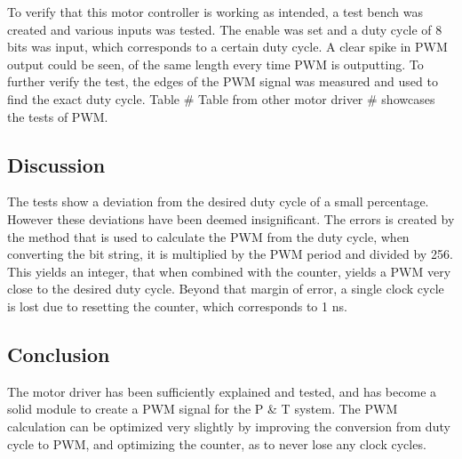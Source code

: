 To verify that this motor controller is working as intended, a test bench was created and various inputs was tested. The enable was set and a duty cycle of 8 bits was input, which corresponds to a certain duty cycle. A clear spike in PWM output could be seen, of the same length every time PWM is outputting.
To further verify the test, the edges of the PWM signal was measured and used to find the exact duty cycle. Table \# Table from other motor driver \# showcases the tests of PWM.

\subsection{Discussion}

The tests show a deviation from the desired duty cycle of a small percentage. However these deviations have been deemed insignificant. The errors is created by the method that is used to calculate the PWM from the duty cycle, when converting the bit string, it is multiplied by the PWM period and divided by 256. This yields an integer, that when combined with the counter, yields a PWM very close to the desired duty cycle. Beyond that margin of error, a single clock cycle is lost due to resetting the counter, which corresponds to 1 ns.


\subsection{Conclusion}

The motor driver has been sufficiently explained and tested, and has become a solid module to create a PWM signal for the P \& T system. The PWM calculation can be optimized very slightly by improving the conversion from duty cycle to PWM, and optimizing the counter, as to never lose any clock cycles.
